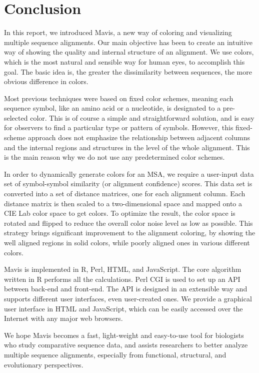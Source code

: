 \chapter{Conclusion}\label{chap:Conclusion}

In this report, we introduced Mavis, a new way of coloring and visualizing multiple sequence alignments. Our main objective has been to create an intuitive way of showing the quality and internal structure of an alignment. We use colors, which is the most natural and sensible way for human eyes, to accomplish this goal. The basic idea is, the greater the dissimilarity between sequences, the more obvious difference in colors.

Most previous techniques were based on fixed color schemes, meaning each sequence symbol, like an amino acid or a nucleotide, is designated to a pre-selected color. This is of course a simple and straightforward solution, and is easy for observers to find a particular type or pattern of symbols. However, this fixed-scheme approach does not emphasize the relationship between adjacent columns and the internal regions and structures in the level of the whole alignment. This is the main reason why we do not use any predetermined color schemes.

In order to dynamically generate colors for an MSA, we require a user-input data set of symbol-symbol similarity (or alignment confidence) scores. This data set is converted into a set of distance matrices, one for each alignment column. Each distance matrix is then scaled to a two-dimensional space and mapped onto a CIE Lab color space to get colors. To optimize the result, the color space is rotated and flipped to reduce the overall color noise level as low as possible. This strategy brings significant improvement to the alignment coloring, by showing the well aligned regions in solid colors, while poorly aligned ones in various different colors.

Mavis is implemented in R, Perl, HTML, and JavaScript. The core algorithm written in R performs all the calculations. Perl CGI is used to set up an API between back-end and front-end. The API is designed in an extensible way and supports different user interfaces, even user-created ones. We provide a graphical user interface in HTML and JavaScript, which can be easily accessed over the Internet with any major web browsers.

We hope Mavis becomes a fast, light-weight and easy-to-use tool for biologists who study comparative sequence data, and assists researchers to better analyze multiple sequence alignments, especially from functional, structural, and evolutionary perspectives.